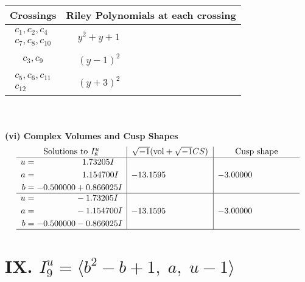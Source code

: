 \documentclass[1p]{elsarticle_modified}
\theoremstyle{definition}
\newcommand{\I}{\sqrt{-1}}
\begin{document}
\begin{tabular}{m{50pt}|m{274pt}}
Crossings & \hspace{64pt}Riley Polynomials at each crossing \\
\hline $$\begin{aligned}c_{1},c_{2},c_{4}\\c_{7},c_{8},c_{10}\end{aligned}$$&$\begin{aligned}
&y^2+y+1
\end{aligned}$\\
\hline $$\begin{aligned}c_{3},c_{9}\end{aligned}$$&$\begin{aligned}
&(y-1)^2
\end{aligned}$\\
\hline $$\begin{aligned}c_{5},c_{6},c_{11}\\c_{12}\end{aligned}$$&$\begin{aligned}
&(y+3)^2
\end{aligned}$\\
\hline
\end{tabular}\\~\\
\newpage\flushleft \textbf{(vi) Complex Volumes and Cusp Shapes}
$$\begin{array}{c|c|c}  
\text{Solutions to }I^u_{8}& \I (\text{vol} + \sqrt{-1}CS) & \text{Cusp shape}\\
 \hline 
\begin{aligned}
u &= \phantom{-0.000000 -}1.73205 I \\
a &= \phantom{-0.000000 -}1.154700 I \\
b &= -0.500000 + 0.866025 I\end{aligned}
 & -13.1595\phantom{ +0.000000I} & -3.00000\phantom{ +0.000000I} \\ \hline\begin{aligned}
u &= \phantom{-0.000000 } -1.73205 I \\
a &= \phantom{-0.000000 } -1.154700 I \\
b &= -0.500000 - 0.866025 I\end{aligned}
 & -13.1595\phantom{ +0.000000I} & -3.00000\phantom{ +0.000000I}\\
 \hline 
 \end{array}$$\newpage\newpage\renewcommand{\arraystretch}{1}
\centering \section*{IX. $I^u_{9}= \langle b^2- b+1,\;a,\;u-1 \rangle$}
\end{document}
